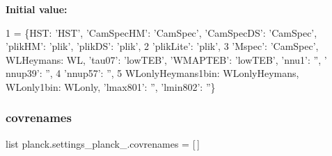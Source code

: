 {\bfseries Initial value\+:}
\begin{DoxyCode}
1 =  \{HST: \textcolor{stringliteral}{'HST'}, \textcolor{stringliteral}{'CamSpecHM'}: \textcolor{stringliteral}{'CamSpec'}, \textcolor{stringliteral}{'CamSpecDS'}: \textcolor{stringliteral}{'CamSpec'}, \textcolor{stringliteral}{'plikHM'}: \textcolor{stringliteral}{'plik'}, \textcolor{stringliteral}{'plikDS'}: \textcolor{stringliteral}{'plik'},
2                    \textcolor{stringliteral}{'plikLite'}: \textcolor{stringliteral}{'plik'},
3                    \textcolor{stringliteral}{'Mspec'}: \textcolor{stringliteral}{'CamSpec'}, WLHeymans: WL, \textcolor{stringliteral}{'tau07'}: \textcolor{stringliteral}{'lowTEB'}, \textcolor{stringliteral}{'WMAPTEB'}: \textcolor{stringliteral}{'lowTEB'}, \textcolor{stringliteral}{'nnu1'}: \textcolor{stringliteral}{''}, \textcolor{stringliteral}{'
      nnup39'}: \textcolor{stringliteral}{''},
4                    \textcolor{stringliteral}{'nnup57'}: \textcolor{stringliteral}{''},
5                    WLonlyHeymans1bin: WLonlyHeymans, WLonly1bin: WLonly, \textcolor{stringliteral}{'lmax801'}: \textcolor{stringliteral}{''}, \textcolor{stringliteral}{'lmin802'}: \textcolor{stringliteral}{''}\}
\end{DoxyCode}
\mbox{\label{namespaceplanck_1_1settings__planck__2015_af879ef56dbb22b01d72c8ebdc65d4d0b}} 
\subsubsection{\texorpdfstring{covrenames}{covrenames}}
{\footnotesize\ttfamily list planck.\+settings\+\_\+planck\+\_.\+covrenames = \mbox{[}$\,$\mbox{]}}

\mbox{\label{namespaceplanck_1_1settings__planck__2015_a9349449a25760a5f21bf839a04049b7f}} 
